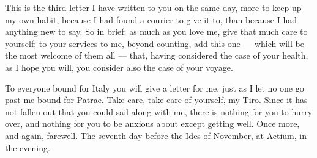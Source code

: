 

 This is the third letter I have written to you on the same day, more to keep up my own habit, because I had found a courier to give it to, than because I had anything new to say. So in brief: as much as you love me, give that much care to yourself; to your services to me, beyond counting, add this one --- which will be the most welcome of them all --- that, having considered the case of your health, as I hope you will, you consider also the case of your voyage.

 To everyone bound for Italy you will give a letter for me, just as I let no one go past me bound for Patrae. Take care, take care of yourself, my Tiro. Since it has not fallen out that you could sail along with me, there is nothing for you to hurry over, and nothing for you to be anxious about except getting well. Once more, and again, farewell. The seventh day before the Ides of November, at Actium, in the evening.
